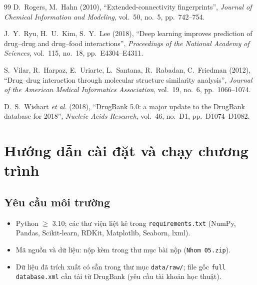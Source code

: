 \documentclass[12pt,a4paper,oneside]{report}
\newcommand{\bmchapname}{Chương}
\renewcommand{\appendixname}{Phụ lục}%
\newcommand{\tocchapname}{Chương}
\begin{document}
\begin{thebibliography}{99}
D.~Rogers, M.~Hahn (2010), ``Extended-connectivity fingerprints'',
\textit{Journal of Chemical Information and Modeling}, vol.~50, no.~5,
pp.~742--754.

J.~Y.~Ryu, H.~U.~Kim, S.~Y.~Lee (2018), ``Deep learning improves prediction of
drug--drug and drug--food interactions'', \textit{Proceedings of the National
Academy of Sciences}, vol.~115, no.~18, pp.~E4304--E4311.

S.~Vilar, R.~Harpaz, E.~Uriarte, L.~Santana, R.~Rabadan, C.~Friedman (2012),
``Drug--drug interaction through molecular structure similarity analysis'',
\textit{Journal of the American Medical Informatics Association}, vol.~19,
no.~6, pp.~1066--1074.

D.~S.~Wishart \textit{et al.} (2018), ``DrugBank 5.0: a major update to the
DrugBank database for 2018'', \textit{Nucleic Acids Research}, vol.~46,
no.~D1, pp.~D1074--D1082.

\end{thebibliography}

\appendix
\renewcommand{\bmchapname}{Phụ lục}
\addtocontents{toc}{\protect\renewcommand{\protect\tocchapname}{\appendixname}}

\chapter{Hướng dẫn cài đặt và chạy chương trình}
\label{pl:huongdan}

\section{Yêu cầu môi trường}
\begin{itemize}
  \item Python $\geq$ 3.10; các thư viện liệt kê trong \texttt{requirements.txt}
        (NumPy, Pandas, Scikit-learn, RDKit, Matplotlib, Seaborn, lxml).
  \item Mã nguồn và dữ liệu: nộp kèm trong thư mục bài nộp (\texttt{Nhom 05.zip}).
  \item Dữ liệu đã trích xuất có sẵn trong thư mục \texttt{data/raw/}; file gốc
        \texttt{full database.xml} cần tải từ DrugBank (yêu cầu tài khoản học thuật).
\end{itemize}
\end{document}
